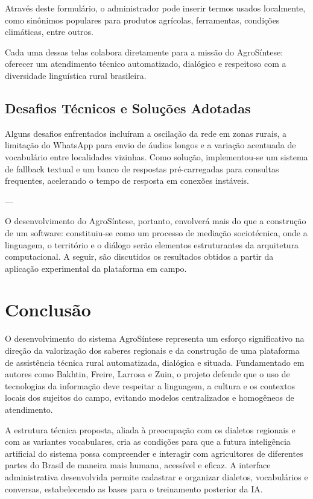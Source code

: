 Através deste formulário, o administrador pode inserir termos usados localmente, como sinônimos populares para produtos agrícolas, ferramentas, condições climáticas, entre outros.

Cada uma dessas telas colabora diretamente para a missão do AgroSíntese: oferecer um atendimento técnico automatizado, dialógico e respeitoso com a diversidade linguística rural brasileira.


\section{Desafios Técnicos e Soluções Adotadas}

Alguns desafios enfrentados incluíram a oscilação da rede em zonas rurais, a limitação do WhatsApp para envio de áudios longos e a variação acentuada de vocabulário entre localidades vizinhas. Como solução, implementou-se um sistema de fallback textual e um banco de respostas pré-carregadas para consultas frequentes, acelerando o tempo de resposta em conexões instáveis.

---

O desenvolvimento do AgroSíntese, portanto, envolverá mais do que a construção de um software: constituiu-se como um processo de mediação sociotécnica, onde a linguagem, o território e o diálogo serão elementos estruturantes da arquitetura computacional. A seguir, são discutidos os resultados obtidos a partir da aplicação experimental da plataforma em campo.


\chapter*{Conclusão}

O desenvolvimento do sistema AgroSíntese representa um esforço significativo na direção da valorização dos saberes regionais e da construção de uma plataforma de assistência técnica rural automatizada, dialógica e situada. Fundamentado em autores como Bakhtin, Freire, Larrosa e Zuin, o projeto defende que o uso de tecnologias da informação deve respeitar a linguagem, a cultura e os contextos locais dos sujeitos do campo, evitando modelos centralizados e homogêneos de atendimento.

A estrutura técnica proposta, aliada à preocupação com os dialetos regionais e com as variantes vocabulares, cria as condições para que a futura inteligência artificial do sistema possa compreender e interagir com agricultores de diferentes partes do Brasil de maneira mais humana, acessível e eficaz. A interface administrativa desenvolvida permite cadastrar e organizar dialetos, vocabulários e conversas, estabelecendo as bases para o treinamento posterior da IA.

